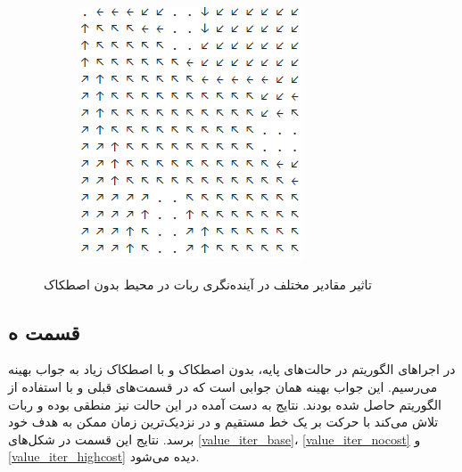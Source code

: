 \documentclass[12pt, a4paper]{article}
\begin{document}
\begin{figure}[h]
\begin{subfigure}{0.45\linewidth}
        \includegraphics[width=\linewidth]{images/q4/d/nocost/discount_01.png}
        \caption{}
    \end{subfigure}
    \caption{تاثیر مقادیر مختلف  در آینده‌نگری ربات در محیط بدون اصطکاک}
    \label{nocost_env}
\end{figure}

\clearpage

\subsection*{قسمت ه}

در اجراهای الگوریتم  در حالت‌های پایه، بدون اصطکاک و با اصطکاک زیاد به جواب
بهینه می‌رسیم. این جواب بهینه همان جوابی است که در قسمت‌های قبلی و با استفاده از الگوریتم
 حاصل شده بودند. نتایج به دست آمده در این حالت نیز منطقی بوده و ربات تلاش می‌کند
با حرکت بر یک خط مستقیم و در نزدیک‌ترین زمان ممکن به هدف خود برسد. نتایج این قسمت در شکل‌های
\ref{value_iter_base}، \ref{value_iter_nocost} و \ref{value_iter_highcost} دیده می‌شود.
\end{document}
